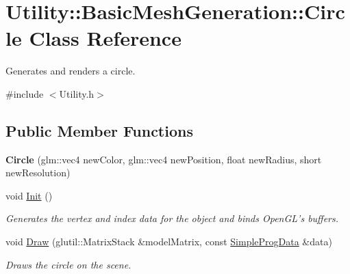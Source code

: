 \hypertarget{class_utility_1_1_basic_mesh_generation_1_1_circle}{\section{Utility\-:\-:Basic\-Mesh\-Generation\-:\-:Circle Class Reference}
\label{class_utility_1_1_basic_mesh_generation_1_1_circle}
}


Generates and renders a circle.  




{\ttfamily \#include $<$Utility.\-h$>$}

\subsection*{Public Member Functions}
\begin{DoxyCompactItemize}
\item 
\hypertarget{class_utility_1_1_basic_mesh_generation_1_1_circle_a495cd76f18a985924d661e0b11da9603}{{\bfseries Circle} (glm\-::vec4 new\-Color, glm\-::vec4 new\-Position, float new\-Radius, short new\-Resolution)}\label{class_utility_1_1_basic_mesh_generation_1_1_circle_a495cd76f18a985924d661e0b11da9603}

\item 
void \hyperlink{class_utility_1_1_basic_mesh_generation_1_1_circle_a9cec759d08091116ff27381b4be7f423}{Init} ()
\begin{DoxyCompactList}\small\item\em Generates the vertex and index data for the object and binds Open\-G\-L's buffers. \end{DoxyCompactList}\item 
\hypertarget{class_utility_1_1_basic_mesh_generation_1_1_circle_acef62a387da6556686f5d479b3e02faa}{void \hyperlink{class_utility_1_1_basic_mesh_generation_1_1_circle_acef62a387da6556686f5d479b3e02faa}{Draw} (glutil\-::\-Matrix\-Stack \&model\-Matrix, const \hyperlink{struct_simple_prog_data}{Simple\-Prog\-Data} \&data)}\label{class_utility_1_1_basic_mesh_generation_1_1_circle_acef62a387da6556686f5d479b3e02faa}

\begin{DoxyCompactList}\small\item\em Draws the circle on the scene. \end{DoxyCompactList}\end{DoxyCompactItemize}
